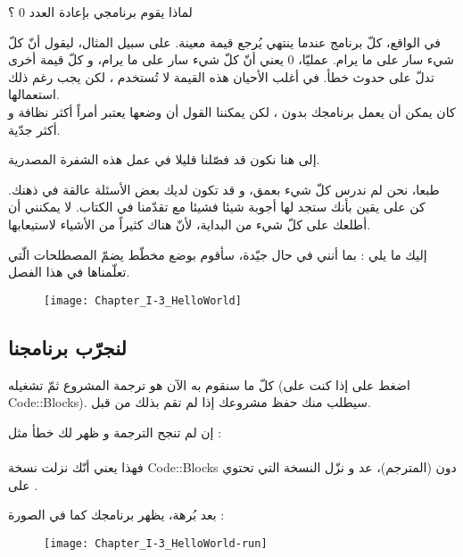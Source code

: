  \begin{question}
   لماذا يقوم برنامجي بإعادة العدد 0 ؟
 \end{question}

 في الواقع، كلّ برنامج عندما ينتهي يُرجع قيمة معينة. على سبيل المثال، ليقول أنّ كلّ شيء سار على ما يرام. عمليّا، 0 يعني  أنّ كلّ شيء سار على ما يرام، و كلّ قيمة أخرى تدلّ على حدوث خطأ. في أغلب الأحيان هذه القيمة لا تُستخدم ، لكن يجب رغم ذلك استعمالها.\\
 كان يمكن أن يعمل برنامجك بدون
، لكن يمكننا القول أن وضعها يعتبر أمراً أكثر نظافة و أكثر جدّية.

إلى هنا نكون قد فصّلنا قليلا في عمل هذه الشفرة المصدرية.

طبعا، نحن لم ندرس كلّ شيء بعمق، و قد تكون لديك بعض الأسئلة عالقة في ذهنك. كن على يقين بأنك ستجد لها أجوبة شيئا فشيئا مع تقدّمنا في الكتاب. لا يمكنني أن أطلعك على كلّ شيء من البداية، لأنّ هناك كثيراً من الأشياء لاستيعابها.

إليك ما يلي : بما أنني في حال جيّدة، سأقوم بوضع مخطّط يضمّ المصطلحات الّتي تعلّمناها في هذا الفصل.

\begin{figure}[H]
	\centering
	\texttt{[image: Chapter\_I-3\_HelloWorld]}
\end{figure}

\subsection{لنجرّب برنامجنا}

كلّ ما سنقوم به الآن هو ترجمة المشروع ثمّ تشغيله (اضغط على
 إذا كنت على
\textenglish{Code::Blocks}).
سيطلب منك حفظ مشروعك إذا لم تقم بذلك من قبل.

\begin{critical}
  إن لم تنجح الترجمة و ظهر لك خطأ مثل :\\
\\
فهذا يعني أنّك نزلت نسخة
\textenglish{Code::Blocks}
 دون
 (المترجم)، عد و نزّل النسخة التي تحتوي على
.
\end{critical}

بعد بُرهة، يظهر برنامجك كما في الصورة :

\begin{figure}[H]
	\centering
	\texttt{[image: Chapter\_I-3\_HelloWorld-run]}
\end{figure}

